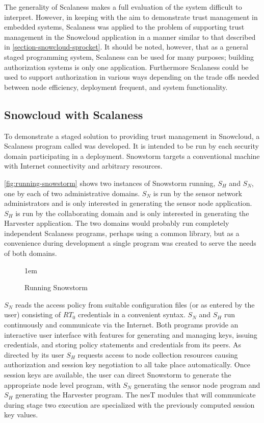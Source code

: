 The generality of Scalaness makes a full evaluation of the system difficult to interpret.
However, in keeping with the aim to demonstrate trust management in embedded systems, Scalaness
was applied to the problem of supporting trust management in the Snowcloud application in a
manner similar to that described in \autoref{section-snowcloud-sprocket}. It should be noted,
however, that as a general staged programming system, Scalaness can be used for many purposes;
building authorization systems is only one application. Furthermore Scalaness could be used to
support authorization in various ways depending on the trade offs needed between node
efficiency, deployment frequent, and system functionality.

\subsection{Snowcloud with Scalaness}

To demonstrate a staged solution to providing trust management in Snowcloud, a Scalaness program
called  was developed. It is intended to be run by each security domain
participating in a deployment. Snowstorm targets a conventional machine with Internet
connectivity and arbitrary resources.

\autoref{fig:running-snowstorm} shows two instances of Snowstorm running, $S_H$ and $S_N$, one
by each of two administrative domains. $S_N$ is run by the sensor network administrators and is
only interested in generating the sensor node application. $S_H$ is run by the collaborating
domain and is only interested in generating the Harvester application. The two domains would
probably run completely independent Scalaness programs, perhaps using a common library, but as a
convenience during development a single program was created to serve the needs of both domains.

\begin{figure}[t]
  
  \centerline{\raise 1em\box\graph}
  \caption{Running Snowstorm}
  \label{fig:running-snowstorm}
\end{figure}

$S_N$ reads the access policy from suitable configuration files (or as entered by the user)
consisting of $RT_0$ credentials in a convenient syntax. $S_N$ and $S_H$ run continuously and
communicate via the Internet. Both programs provide an interactive user interface with features
for generating and managing keys, issuing credentials, and storing policy statements and
credentials from its peers. As directed by its user $S_H$ requests access to node collection
resources causing authorization and session key negotiation to all take place automatically.
Once session keys are available, the user can direct Snowstorm to generate the appropriate node
level program, with $S_N$ generating the sensor node program and $S_H$ generating the Harvester
program. The nesT modules that will communicate during stage two execution are specialized with
the previously computed session key values.

